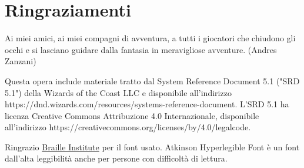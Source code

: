 \section{Ringraziamenti}

\begin{enfasi}{
			\begin{center}
Ai miei amici, ai miei compagni di avventura, a tutti i giocatori che chiudono gli occhi e si lasciano guidare dalla fantasia in meravigliose avventure. (Andres Zanzani)
			\end{center}
}\end{enfasi}

\medskip

Questa opera include materiale tratto dal System Reference Document 5.1 ("SRD 5.1") della Wizards of the Coast LLC e disponibile all'indirizzo https://dnd.wizards.com/resources/systems-reference-document. L'SRD 5.1 ha licenza Creative Commons Attribuzione 4.0 Internazionale, disponibile all'indirizzo https://creativecommons.org/licenses/by/4.0/legalcode.


\medskip


Ringrazio \href{https://www.brailleinstitute.org/freefont/}{Braille Institute} per il font usato. Atkinson Hyperlegible Font è un font dall'alta leggibilità anche per persone con difficoltà di lettura.
